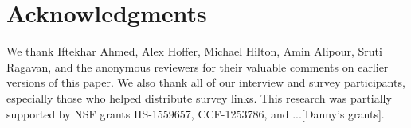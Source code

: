 \section*{Acknowledgments}

We thank Iftekhar Ahmed, Alex Hoffer, Michael Hilton, Amin Alipour, Sruti Ragavan, and the anonymous reviewers for their valuable comments on earlier versions of this paper.
We also thank all of our interview and survey participants, especially those who helped distribute survey links.
This research was partially supported by NSF grants IIS-1559657, CCF-1253786, and ...[Danny's grants].
